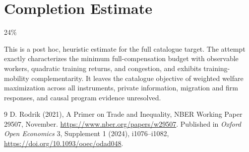 \documentclass[11pt]{article}
\theoremstyle{remark}\newtheorem{remark}[theorem]{Remark}
\begin{document}
\section{Completion Estimate}
24\%

This is a post hoc, heuristic estimate for the full catalogue target.
The attempt exactly characterizes the minimum full-compensation budget with observable workers, quadratic training returns, and congestion, and exhibits training-mobility complementarity. It leaves the catalogue objective of weighted welfare maximization across all instruments, private information, migration and firm responses, and causal program evidence unresolved.

\begin{thebibliography}{9}
 D. Rodrik (2021), A Primer on Trade and Inequality, NBER Working Paper 29507, November. \url{https://www.nber.org/papers/w29507}. Published in \emph{Oxford Open Economics} 3, Supplement 1 (2024), i1076--i1082, \url{https://doi.org/10.1093/ooec/odad048}.
\end{thebibliography}
\end{document}
